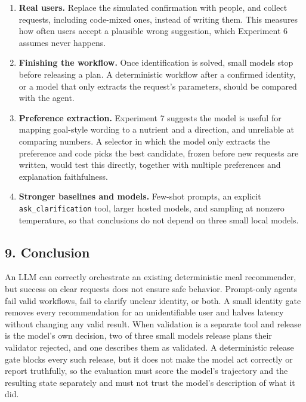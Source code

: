 \documentclass[
  10pt,
  letterpaper,
]{article}
\providecommand{\tightlist}{%
  \setlength{\itemsep}{0pt}\setlength{\parskip}{0pt}}
\begin{document}
\begin{enumerate}
\def\labelenumi{\arabic{enumi}.}
\tightlist
\item
  \textbf{Real users.} Replace the simulated confirmation with people,
  and collect requests, including code-mixed ones, instead of writing
  them. This measures how often users accept a plausible wrong
  suggestion, which Experiment 6 assumes never happens.
\item
  \textbf{Finishing the workflow.} Once identification is solved, small
  models stop before releasing a plan. A deterministic workflow after a
  confirmed identity, or a model that only extracts the request's
  parameters, should be compared with the agent.
\item
  \textbf{Preference extraction.} Experiment 7 suggests the model is
  useful for mapping goal-style wording to a nutrient and a direction,
  and unreliable at comparing numbers. A selector in which the model
  only extracts the preference and code picks the best candidate, frozen
  before new requests are written, would test this directly, together
  with multiple preferences and explanation faithfulness.
\item
  \textbf{Stronger baselines and models.} Few-shot prompts, an explicit
  \texttt{ask\_clarification} tool, larger hosted models, and sampling
  at nonzero temperature, so that conclusions do not depend on three
  small local models.
\end{enumerate}

\subsection{9. Conclusion}\label{conclusion}

An LLM can correctly orchestrate an existing deterministic meal
recommender, but success on clear requests does not ensure safe
behavior. Prompt-only agents fail valid workflows, fail to clarify
unclear identity, or both. A small identity gate removes every
recommendation for an unidentifiable user and halves latency without
changing any valid result. When validation is a separate tool and
release is the model's own decision, two of three small models release
plans their validator rejected, and one describes them as validated. A
deterministic release gate blocks every such release, but it does not
make the model act correctly or report truthfully, so the evaluation
must score the model's trajectory and the resulting state separately and
must not trust the model's description of what it did.
\end{document}
